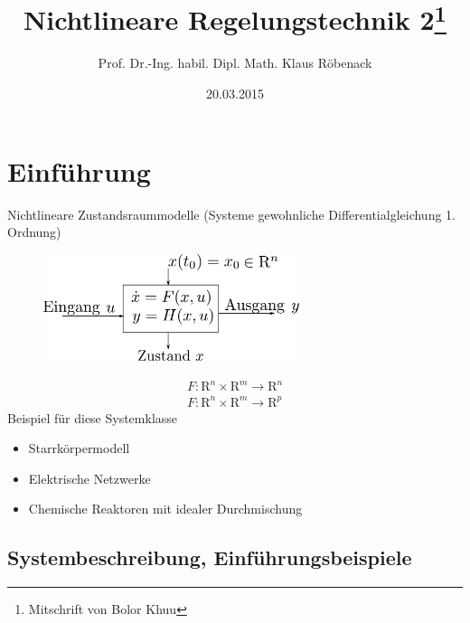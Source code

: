 \documentclass[ngerman]{tudscrreprt}
\begin{document}
 \department{}   \title{Nichtlineare Regelungstechnik 2{\footnote{Mitschrift von Bolor Khuu}}
}
\author{Prof. Dr.-Ing. habil. Dipl. Math. Klaus Röbenack}
\date{20.03.2015}
\maketitle
\tableofcontents
\newpage
\chapter{Einführung}
Nichtlineare Zustandsraummodelle (Systeme gewohnliche Differentialgleichung 1. Ordnung)\\
\begin{figure}[H]
\centering
\def\svgwidth{200pt} 
  \includegraphics[width=7.5cm]{images/image1.pdf}
\end{figure}
\begin{equation*}
\begin{matrix}
F:\mathrm{R}^n \times \mathrm{R}^m \to \mathrm{R}^n \\ 
F:\mathrm{R}^n \times \mathrm{R}^m \to \mathrm{R}^p
\end{matrix}
\end{equation*}
Beispiel für diese Systemklasse 
\begin{itemize}
\item Starrkörpermodell
\item Elektrische Netzwerke
\item Chemische Reaktoren mit idealer Durchmischung
\end{itemize}
\section{Systembeschreibung, Einführungsbeispiele}
\end{document}
